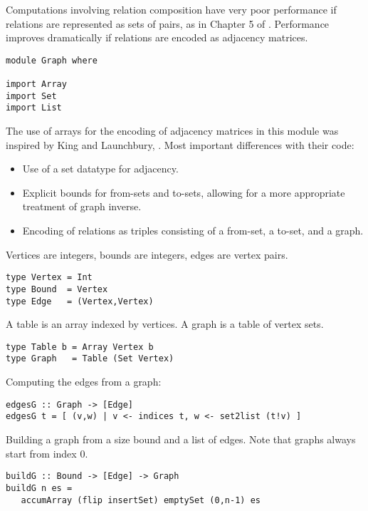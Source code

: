 Computations involving relation composition have very poor performance
if relations are represented as sets of pairs, as in Chapter 5 of
\cite{DoeEij04:thr}. Performance improves dramatically 
if relations are encoded as adjacency matrices. 

\bc\begin{verbatim}
module Graph where 

import Array
import Set
import List
\end{verbatim}\ec

The use of arrays for the encoding of adjacency matrices in this
module was inspired by King and Launchbury, \cite{KinLau95:sdfsaih}. 
Most important differences with their code: 
\begin{itemize} 
\item Use of a set datatype for adjacency. 
\item Explicit bounds for from-sets and to-sets, allowing for a more appropriate
      treatment of graph inverse. 
\item Encoding of relations as triples consisting of a from-set, a to-set, and 
      a graph. 
\end{itemize} 

Vertices are integers, bounds are integers, edges are vertex pairs. 

\bc\begin{verbatim}
type Vertex = Int
type Bound  = Vertex
type Edge   = (Vertex,Vertex)
\end{verbatim}\ec

A table is an array indexed by vertices. A graph
is a table of vertex sets. 

\bc\begin{verbatim}
type Table b = Array Vertex b 
type Graph   = Table (Set Vertex)
\end{verbatim}\ec

Computing the edges from a graph: 

\bc\begin{verbatim}
edgesG :: Graph -> [Edge]
edgesG t = [ (v,w) | v <- indices t, w <- set2list (t!v) ]
\end{verbatim}\ec

Building a graph from a size bound and a list of 
edges. Note that graphs always start from index $0$. 

\bc\begin{verbatim}
buildG :: Bound -> [Edge] -> Graph 
buildG n es = 
   accumArray (flip insertSet) emptySet (0,n-1) es
\end{verbatim}\ec

